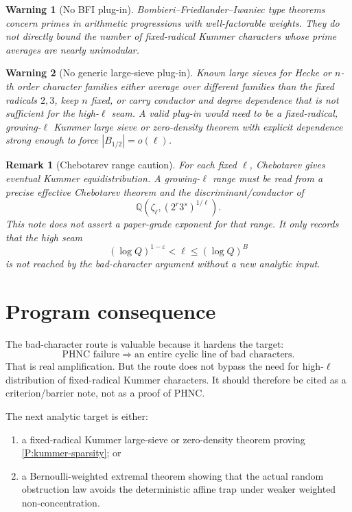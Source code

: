 \documentclass[11pt]{article}
\newtheorem{remark}{Remark}
\newtheorem{warning}{Warning}
\newcommand{\Q}{\mathbb Q}
\newcommand{\1}{\mathbf 1}
\begin{document}
\begin{warning}[No BFI plug-in]
Bombieri--Friedlander--Iwaniec type theorems concern primes in arithmetic progressions with well-factorable weights.  They do not directly bound the number of fixed-radical Kummer characters whose prime averages are nearly unimodular.
\end{warning}

\begin{warning}[No generic large-sieve plug-in]
Known large sieves for Hecke or \(n\)-th order character families either average over different families than the fixed radicals \(2,3\), keep \(n\) fixed, or carry conductor and degree dependence that is not sufficient for the high-\(\ell\) seam.  A valid plug-in would need to be a fixed-radical, growing-\(\ell\) Kummer large sieve or zero-density theorem with explicit dependence strong enough to force \(|B_{1/2}|=o(\ell)\).
\end{warning}

\begin{remark}[Chebotarev range caution]
For each fixed \(\ell\), Chebotarev gives eventual Kummer equidistribution.  A growing-\(\ell\) range must be read from a precise effective Chebotarev theorem and the discriminant/conductor of
\[
\Q(\zeta_\ell,(2^r3^s)^{1/\ell}).
\]
This note does not assert a paper-grade exponent for that range.  It only records that the high seam
\[
(\log Q)^{1-\varepsilon}<\ell\le(\log Q)^B
\]
is not reached by the bad-character argument without a new analytic input.
\end{remark}

\section{Program consequence}

The bad-character route is valuable because it hardens the target:
\[
\text{PHNC failure}\Rightarrow\text{an entire cyclic line of bad characters}.
\]
That is real amplification.  But the route does not bypass the need for high-\(\ell\) distribution of fixed-radical Kummer characters.  It should therefore be cited as a criterion/barrier note, not as a proof of PHNC.

The next analytic target is either:
\begin{enumerate}[leftmargin=2em]
\item a fixed-radical Kummer large-sieve or zero-density theorem proving \cref{P:kummer-sparsity}; or
\item a Bernoulli-weighted extremal theorem showing that the actual random obstruction law avoids the deterministic affine trap under weaker weighted non-concentration.
\end{enumerate}
\end{document}
